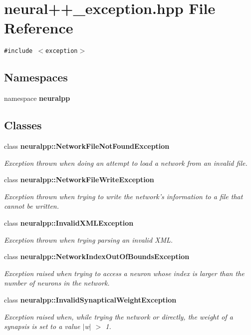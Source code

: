 \section{neural++\_\-exception.hpp File Reference}
\label{neural_09_09__exception_8hpp}
{\tt \#include $<$exception$>$}\par
\subsection*{Namespaces}
\begin{CompactItemize}
\item 
namespace {\bf neuralpp}
\end{CompactItemize}
\subsection*{Classes}
\begin{CompactItemize}
\item 
class {\bf neuralpp::NetworkFileNotFoundException}
\begin{CompactList}\small\item\em Exception thrown when doing an attempt to load a network from an invalid file. \item\end{CompactList}\item 
class {\bf neuralpp::NetworkFileWriteException}
\begin{CompactList}\small\item\em Exception thrown when trying to write the network's information to a file that cannot be written. \item\end{CompactList}\item 
class {\bf neuralpp::InvalidXMLException}
\begin{CompactList}\small\item\em Exception thrown when trying parsing an invalid XML. \item\end{CompactList}\item 
class {\bf neuralpp::NetworkIndexOutOfBoundsException}
\begin{CompactList}\small\item\em Exception raised when trying to access a neuron whose index is larger than the number of neurons in the network. \item\end{CompactList}\item 
class {\bf neuralpp::InvalidSynapticalWeightException}
\begin{CompactList}\small\item\em Exception raised when, while trying the network or directly, the weight of a synapsis is set to a value $|$w$|$ $>$ 1. \item\end{CompactList}\end{CompactItemize}
